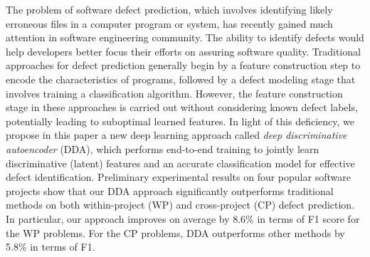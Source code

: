 The problem of software defect prediction, which involves identifying likely erroneous files in a computer program or system, has recently gained much attention in software engineering community. The ability to identify defects would help developers better focus their efforts on assuring software quality. Traditional approaches for defect prediction generally begin by a feature construction step to encode the characteristics of programs, followed by a defect modeling stage that involves training a classification algorithm. However, the feature construction stage in these approaches is carried out without considering known defect labels, potentially leading to suboptimal learned features. In light of this deficiency, we propose in this paper a new deep learning approach called \emph{deep discriminative autoencoder} (DDA), which performs end-to-end training to jointly learn discriminative (latent) features and an accurate classification model for effective defect identification. Preliminary experimental results on four popular software projects show that our DDA approach significantly outperforms traditional methods on both within-project (WP) and cross-project (CP) defect prediction. In particular, our approach improves on average by 8.6\% in terms of F1 score for the WP problems. For the CP problems, DDA outperforms other methods by 5.8\% in terms of F1.




